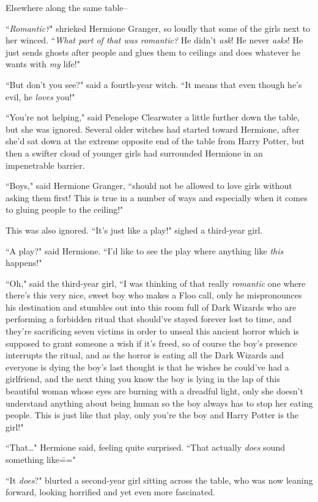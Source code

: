 Elsewhere along the same table\---

``\emph{Romantic?}" shrieked Hermione Granger, so loudly that some of the girls next to her winced. ``\emph{What part of that was romantic?} He didn't \emph{ask}! He never \emph{asks}! He just sends ghosts after people and glues them to ceilings and does whatever he wants with \emph{my} life!"

``But don't you see?" said a fourth-year witch. ``It means that even though he's evil, he \emph{loves} you!"

``You're not helping," said Penelope Clearwater a little further down the table, but she was ignored. Several older witches had started toward Hermione, after she'd sat down at the extreme opposite end of the table from Harry Potter, but then a swifter cloud of younger girls had surrounded Hermione in an impenetrable barrier.

``Boys," said Hermione Granger, ``should not be allowed to love girls without asking them first! This is true in a number of ways and especially when it comes to gluing people to the ceiling!"

This was also ignored. ``It's just like a play!" sighed a third-year girl.

``A play?" said Hermione. ``I'd like to see the play where anything like \emph{this} happens!"

``Oh," said the third-year girl, ``I was thinking of that really \emph{romantic} one where there's this very nice, sweet boy who makes a Floo call, only he mispronounces his destination and stumbles out into this room full of Dark Wizards who are performing a forbidden ritual that should've stayed forever lost to time, and they're sacrificing seven victims in order to unseal this ancient horror which is supposed to grant someone a wish if it's freed, so of course the boy's presence interrupts the ritual, and as the horror is eating all the Dark Wizards and everyone is dying the boy's last thought is that he wishes he could've had a girlfriend, and the next thing you know the boy is lying in the lap of this beautiful woman whose eyes are burning with a dreadful light, only she doesn't understand anything about being human so the boy always has to stop her eating people. This is just like that play, only you're the boy and Harry Potter is the girl!"

``That{\ldots}" Hermione said, feeling quite surprised. ``That actually \emph{does} sound something like\==="

``It \emph{does}?" blurted a second-year girl sitting across the table, who was now leaning forward, looking horrified and yet even more fascinated.

